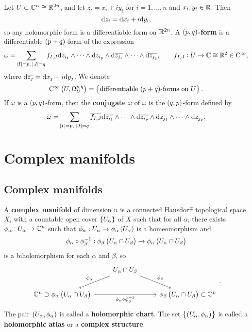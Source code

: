 Let $ U \subset \mathbb{C}^n \cong \mathbb{R}^{2n} $, and let $ z_i = x_i + iy_i $ for $ i = 1, \dots, n $ and $ x_i, y_i \in \mathbb{R} $. Then
$$ \mathrm{d} z_i = \mathrm{d} x_i + i \mathrm{d} y_i, $$
so any holomorphic form is a differentiable form on $ \mathbb{R}^{2n} $. A \textbf{$ \br{p, q} $-form} is a differentiable $ \br{p + q} $-form of the expression
$$ \omega = \sum_{\abs{I} = p, \ \abs{J} = q} f_{I, J} \mathrm{d} z_{i_1} \wedge \dots \wedge \mathrm{d} z_{i_p} \wedge \mathrm{d}\overline{z_{j_1}} \wedge \dots \wedge \mathrm{d}\overline{z_{j_q}}, \qquad f_{I, J} : U \to \mathbb{C} \cong \mathbb{R}^2 \in \mathrm{C}^\infty, $$
where $ \mathrm{d}\overline{z_j} = \mathrm{d} x_j - i \mathrm{d} y_j $. We denote
$$ \C^\infty\br{U, \Omega_U^{p, q}} = \cbr{\text{differentiable $ \br{p + q} $-forms on} \ U}. $$
If $ \omega $ is a $ \br{p, q} $-form, then the \textbf{conjugate} $ \overline{\omega} $ of $ \omega $ is the $ \br{q, p} $-form defined by
$$ \overline{\omega} = \sum_{\abs{I} = p, \ \abs{J} = q} \overline{f_{I, J}} \d\overline{z_{i_1}} \wedge \dots \wedge \d\overline{z_{i_p}} \wedge \d z_{j_1} \wedge \dots \wedge \d z_{j_q}. $$

\pagebreak

\section{Complex manifolds}

\subsection{Complex manifolds}

\begin{definition}
A \textbf{complex manifold} of dimension $ n $ is a connected Hausdorff topological space $ X $, with a countable open cover $ \cbr{U_\alpha} $ of $ X $ such that for all $ \alpha $, there exists $ \phi_\alpha : U_\alpha \to \mathbb{C}^n $ such that $ \phi_\alpha : U_\alpha \to \phi_\alpha\br{U_\alpha} $ is a homeomorphism and
$$ \phi_\alpha \circ \phi_\beta^{-1} : \phi_\beta\br{U_\alpha \cap U_\beta} \to \phi_\alpha\br{U_\alpha \cap U_\beta} $$
is a biholomorphism for each $ \alpha $ and $ \beta $, so
$$
\begin{tikzcd}
& U_\alpha \cap U_\beta \arrow[swap]{dl}{\phi_\alpha} \arrow{dr}{\phi_\beta} & \\
\CC^n \supset \phi_\alpha\br{U_\alpha \cap U_\beta} \arrow[swap]{rr}{\phi_\alpha \circ \phi_\beta^{-1}} & & \phi_\beta\br{U_\alpha \cap U_\beta} \subset \CC^n
\end{tikzcd}.
$$
The pair $ \br{U_\alpha, \phi_\alpha} $ is called a \textbf{holomorphic chart}. The set $ \cbr{\br{U_\alpha, \phi_\alpha}} $ is called a \textbf{holomorphic atlas} or a \textbf{complex structure}.
\end{definition}

